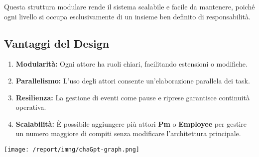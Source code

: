 Questa struttura modulare rende il sistema scalabile e facile da mantenere, poiché ogni livello si occupa esclusivamente di un insieme ben definito di responsabilità.

\subsection*{Vantaggi del Design}
\begin{enumerate}
    \item \textbf{Modularità:} Ogni attore ha ruoli chiari, facilitando estensioni o modifiche.
    \item \textbf{Parallelismo:} L'uso degli attori consente un'elaborazione parallela dei task.
    \item \textbf{Resilienza:} La gestione di eventi come pause e riprese garantisce continuità operativa.
    \item \textbf{Scalabilità:} È possibile aggiungere più attori \textbf{Pm} o \textbf{Employee} per gestire un numero maggiore di compiti senza modificare l'architettura principale.
\end{enumerate}


\texttt{[image: /report/imng/chaGpt-graph.png]}\\[0.5cm]